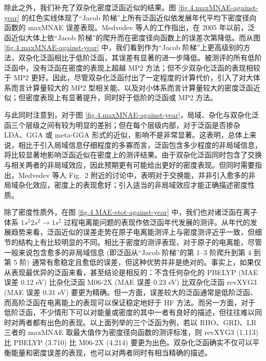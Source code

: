 除此之外，我们补充了双杂化密度泛函近似的结果。图 \ref{fig.4.maxMNAE-against-year} 的红色实线体现了“Jacob 阶梯”上所有泛函近似依发展年代平均下密度径向函数的 maxMNAE 误差表现。Medvedev 等人的工作指出，在 2005 年以前，泛函近似大体上依“Jacob 阶梯”的爬升而在密度径向函数上的误差次第降低。而从图 \ref{fig.4.maxMNAE-against-year} 中，我们看到作为“Jacob 阶梯”上更高级别的方法，双杂化泛函相比于低阶泛函，其误差有显著的进一步降低。被测评的所有低阶泛函中，没有泛函在密度的表现上超越 MP2 方法；但不少双杂化泛函的表现相较于 MP2 更好。因此，尽管双杂化泛函付出了一定程度的计算代价，引入了对大体系而言计算量较大的 MP2 型相关能、以及对小体系而言计算量较大的密度泛函近似；但密度表现上有显著提升，同时好于低阶的泛函或 MP2 方法。

与此同时注意到，对于图 \ref{fig.4.maxMNAE-against-year}，局域、杂化与双杂化泛函三个层级之间有较为明显的差别；但在每个层级内部，对于泛函是否掺杂 LDA、GGA 或 meta-GGA 形式的近似，影响不是非常显著。这表明，总体上来说，相比于引入局域信息仔细程度的多寡而言，泛函包含多少程度的非局域信息，将比较显著地影响泛函近似在密度上的测评结果。由于双杂化泛函同时包含了交换与相关两者的非局域效应，因此预期更有可能给出更好的密度表现。但同时需要指出，Medvedev 等人 Fig.\ 2 附近的讨论中，表明对于交换能，并非引入愈多的非局域杂化效应，密度上的表现愈好；引入适当的非局域效应才能正确描述密度性质。

除了密度性质外，在图 \ref{fig.4.MAE-etot-against-year} 中，我们也对诸泛函在离子体系 $1s^2 2s^2 \rightarrow 1s^2$ 过程电离能问题的表现作依泛函年代发展的测评。从年代的发展趋势来看，泛函近似的误差走势在原子电离能测评上与密度测评近乎一致，但细节的结构上有比较明显的不同。相比于密度的测评表现，对于原子的电离能，尽管一般来说包含愈多的非局域信息 (即泛函从“Jacob 阶梯”的第 1--3 阶爬升到第 4 到第 5 阶) 通常有愈稳定且愈低的误差，但这种优势并非是绝对的。事实上，如果仅从表现最优异的泛函来看，甚至结论是相反的：不含任何杂化的 PBELYP (MAE 误差 0.12 eV) 比杂化泛函 M06-2X (MAE 误差 0.23 eV) 比双杂化泛函 revXYG3 (MAE 误差 0.31 eV) 要更为精确。但一方面，误差较大的泛函通常是低阶泛函、而高阶泛函在电离能上的表现可以保证稳定地好于 HF 方法。而另一方面，对于低阶泛函，不少情形下可以对能量或密度的其中一者有良好的描述，但往往难以同时对两者都有出色的表现。以上面列举的三个泛函为例，若以 RHO、GRD、LR 三者的 maxMNAE 取最大值作为密度径向函数的测评标准，则 revXYG3 (1.113) 比 PBELYP (3.710) 比 M06-2X (4.214) 要更为出色。双杂化泛函确实不仅可以平衡能量和密度误差的表现，也可以对两者同时有相当精确的描述。

